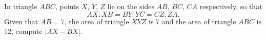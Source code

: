 In triangle $ABC$, points $X$, $Y$, $Z$ lie on the sides $AB$, $BC$, $CA$ respectively, so that
\[AX:XB=BY:YC=CZ:ZA.\]
Given that $AB=7$, the area of triangle $XYZ$ is $7$ and the area of triangle $ABC$ is $12$, compute $|AX-BX|$.
